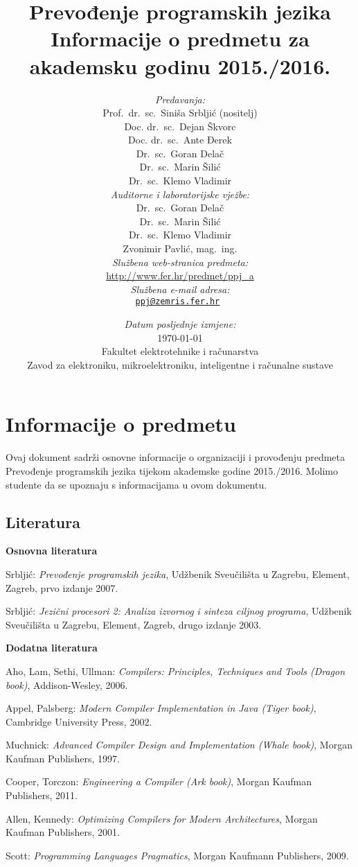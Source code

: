 \documentclass[times, 12pt, utf8]{book}
\title{
\vfill
\textbf{Prevođenje programskih jezika}\\
\vspace{30pt}
Informacije o predmetu za akademsku godinu 2015./2016. \\
\vspace{40pt}
}
\author{
\emph{Predavanja:} \\
Prof.~dr.~sc.~Siniša Srbljić (nositelj) \\
Doc. dr.~sc.~Dejan Škvorc \\
Doc. dr.~sc.~Ante Đerek \\
Dr.~sc.~Goran Delač \\
Dr.~sc.~Marin Šilić \\
\vspace{30pt}
Dr.~sc.~Klemo Vladimir \\
\emph{Auditorne i laboratorijske vježbe:} \\
Dr.~sc.~Goran Delač \\
Dr.~sc.~Marin Šilić \\
Dr.~sc.~Klemo Vladimir \\
\vspace{30pt}
Zvonimir Pavlić, mag.~ing. \\
\emph{Službena web-stranica predmeta:} \\
\vspace{30pt}
\url{http://www.fer.hr/predmet/ppj_a} \\
\emph{Službena e-mail adresa:} \\
\tt{\href{mailto:ppj@zemris.fer.hr}{ppj@zemris.fer.hr}}
}
\date{
\vspace{30pt} 
\emph{Datum posljednje izmjene:} \\
\today \\
\vfill
Fakultet elektrotehnike i računarstva \\
Zavod za elektroniku, mikroelektroniku, inteligentne i računalne sustave
}
\begin{document}
\maketitle

\section*{Informacije o predmetu}

Ovaj dokument sadrži osnovne informacije o organizaciji i provođenju predmeta Prevođenje programskih jezika tijekom akademske godine 2015./2016. 
Molimo studente da se upoznaju s informacijama u ovom dokumentu.

\let\cleardoublepage\relax
{}

\tableofcontents

\cleardoublepage  
{}  
{}  
\subsection*{Literatura}

\textbf{Osnovna literatura}

Srbljić: \textit{Prevođenje programskih jezika}, Udžbenik Sveučilišta u Zagrebu, Element, Zagreb, prvo izdanje 2007.

Srbljić: \textit{Jezični procesori 2: Analiza izvornog i sinteza ciljnog programa}, Udžbenik Sveučilišta u Zagrebu, Element, Zagreb, drugo izdanje 2003.

\textbf{Dodatna literatura}

Aho, Lam, Sethi, Ullman: \textit{Compilers: Principles, Techniques and Tools (Dragon book)}, Addison-Wesley, 2006. 

Appel, Palsberg: \textit{Modern Compiler Implementation in Java (Tiger book)}, Cambridge University Press, 2002.

Muchnick: \textit{Advanced Compiler Design and Implementation (Whale book)}, Morgan Kaufman Publishers, 1997.

Cooper, Torczon: \textit{Engineering a Compiler (Ark book)}, Morgan Kaufman Publishers, 2011.

Allen, Kennedy: \textit{Optimizing Compilers for Modern Architectures}, Morgan Kaufman Publishers, 2001.

Scott: \textit{Programming Languages Pragmatics}, Morgan Kaufmann Publishers, 2009.

\cleardoublepage  
{}
{}
\end{document}
